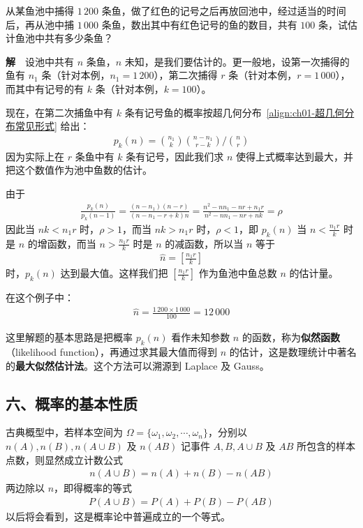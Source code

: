 \documentclass[../../main.tex]{subfiles}
\begin{document}
\begin{example}[鱼群估计]\label{example:ch01-鱼群估计}
从某鱼池中捕得 $1\,200$ 条鱼，做了红色的记号之后再放回池中，经过适当的时间后，再从池中捕 $1\,000$ 条鱼，数出其中有红色记号的鱼的数目，共有 $100$ 条，试估计鱼池中共有多少条鱼？

\textbf{解}~~设池中共有 $n$ 条鱼，$n$ 未知，是我们要估计的。更一般地，设第一次捕得的鱼有 $n_1$ 条（针对本例，$n_1=1\,200$），第二次捕得 $r$ 条（针对本例，$r=1\,000$），而其中有记号的有 $k$ 条（针对本例，$k=100$）。

现在，在第二次捕鱼中有 $k$ 条有记号鱼的概率按超几何分布~\eqref{align:ch01-超几何分布常见形式} 给出：
\begin{align*}
p_k(n)=\binom{n_1}{k}\binom{n-n_1}{r-k}\bigg/\binom{n}{r}
\end{align*}
因为实际上在 $r$ 条鱼中有 $k$ 条有记号，因此我们求 $n$ 使得上式概率达到最大，并把这个数值作为池中鱼数的估计。

由于
\begin{align*}
\frac{p_k(n)}{p_k(n-1)}=\frac{(n-n_1)(n-r)}{(n-n_1-r+k)n}=\frac{n^2-nn_1-nr+n_1 r}{n^2-nn_1-nr+nk}=\rho
\end{align*}
因此当 $nk<n_1 r$ 时，$\rho>1$，而当 $nk>n_1 r$ 时，$\rho<1$，即 $p_k(n)$ 当 $n<\frac{n_1 r}{k}$ 时是 $n$ 的增函数，而当 $n>\frac{n_1 r}{k}$ 时是 $n$ 的减函数，所以当 $n$ 等于
\begin{align*}
\hat{n}=\left[\frac{n_1 r}{k}\right]
\end{align*}
时，$p_k(n)$ 达到最大值。这样我们把 $\left[\frac{n_1 r}{k}\right]$ 作为鱼池中鱼总数 $n$ 的估计量。

在这个例子中：
\begin{align*}
\hat{n}=\frac{1\,200\times 1\,000}{100}=12\,000
\end{align*}

这里解题的基本思路是把概率 $p_k(n)$ 看作未知参数 $n$ 的函数，称为\textbf{似然函数}（likelihood function），再通过求其最大值而得到 $n$ 的估计，这是数理统计中著名的\textbf{最大似然估计法}。这个方法可以溯源到 Laplace 及 Gauss。
\end{example}

\subsection*{六、概率的基本性质}

古典概型中，若样本空间为 $\Omega=\{\omega_1,\omega_2,\cdots,\omega_n\}$，分别以 $n(A),n(B),n(A\cup B)$ 及 $n(AB)$ 记事件 $A,B,A\cup B$ 及 $AB$ 所包含的样本点数，则显然成立计数公式
\begin{align*}
n(A\cup B)=n(A)+n(B)-n(AB)
\end{align*}
两边除以 $n$，即得概率的等式
\begin{align*}
P(A\cup B)=P(A)+P(B)-P(AB)
\end{align*}
以后将会看到，这是概率论中普遍成立的一个等式。
\end{document}
